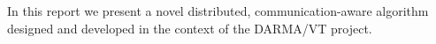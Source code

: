 In this report we present a novel distributed, communication-aware algorithm designed and developed in the context of the DARMA/VT project.
